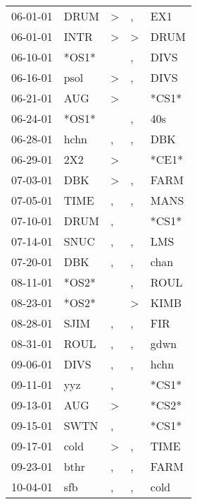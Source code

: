 \begin{supertabular}{lllll}
 06-01-01 &   DRUM &     \textgreater &                , &    EX1 \\
 06-01-01 &   INTR &     \textgreater &     \textgreater &   DRUM \\
 06-10-01 &  *OS1* &                  &                , &   DIVS \\
 06-16-01 &   psol &     \textgreater &                , &   DIVS \\
 06-21-01 &    AUG &     \textgreater &                  &  *CS1* \\
 06-24-01 &  *OS1* &                  &                , &    40s \\
 06-28-01 &   hchn &                , &                , &    DBK \\
 06-29-01 &    2X2 &     \textgreater &                  &  *CE1* \\
 07-03-01 &    DBK &     \textgreater &                , &   FARM \\
 07-05-01 &   TIME &                , &                , &   MANS \\
 07-10-01 &   DRUM &                , &                  &  *CS1* \\
 07-14-01 &   SNUC &                , &                , &    LMS \\
 07-20-01 &    DBK &                , &                , &   chan \\
 08-11-01 &  *OS2* &                  &                , &   ROUL \\
 08-23-01 &  *OS2* &                  &     \textgreater &   KIMB \\
 08-28-01 &   SJIM &                , &                , &    FIR \\
 08-31-01 &   ROUL &                , &                , &   gdwn \\
 09-06-01 &   DIVS &                , &                , &   hchn \\
 09-11-01 &    yyz &                , &                  &  *CS1* \\
 09-13-01 &    AUG &     \textgreater &                  &  *CS2* \\
 09-15-01 &   SWTN &                , &                  &  *CS1* \\
 09-17-01 &   cold &     \textgreater &                , &   TIME \\
 09-23-01 &   bthr &                , &                , &   FARM \\
 10-04-01 &    sfb &                , &                , &   cold \\

\end{supertabular}
